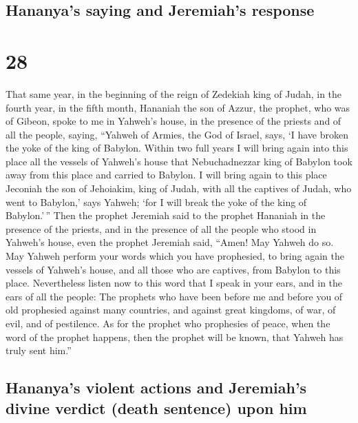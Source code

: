 \hypertarget{hananyas-saying-and-jeremiahs-response}{%
\subsection{Hananya's saying and Jeremiah's
response}\label{hananyas-saying-and-jeremiahs-response}}

\hypertarget{section-27}{%
\section{28}\label{section-27}}

 That same year, in the beginning of the reign of Zedekiah
king of Judah, in the fourth year, in the fifth month, Hananiah the son
of Azzur, the prophet, who was of Gibeon, spoke to me in Yahweh's house,
in the presence of the priests and of all the people, saying,
 ``Yahweh of Armies, the God of Israel, says, `I have
broken the yoke of the king of Babylon.  Within two full
years I will bring again into this place all the vessels of Yahweh's
house that Nebuchadnezzar king of Babylon took away from this place and
carried to Babylon.  I will bring again to this place
Jeconiah the son of Jehoiakim, king of Judah, with all the captives of
Judah, who went to Babylon,' says Yahweh; `for I will break the yoke of
the king of Babylon.'\,''  Then the prophet Jeremiah said
to the prophet Hananiah in the presence of the priests, and in the
presence of all the people who stood in Yahweh's house, 
even the prophet Jeremiah said, ``Amen! May Yahweh do so. May Yahweh
perform your words which you have prophesied, to bring again the vessels
of Yahweh's house, and all those who are captives, from Babylon to this
place.  Nevertheless listen now to this word that I speak
in your ears, and in the ears of all the people:  The
prophets who have been before me and before you of old prophesied
against many countries, and against great kingdoms, of war, of evil, and
of pestilence.  As for the prophet who prophesies of
peace, when the word of the prophet happens, then the prophet will be
known, that Yahweh has truly sent him.''

\hypertarget{hananyas-violent-actions-and-jeremiahs-divine-verdict-death-sentence-upon-him}{%
\subsection{Hananya's violent actions and Jeremiah's divine verdict
(death sentence) upon
him}\label{hananyas-violent-actions-and-jeremiahs-divine-verdict-death-sentence-upon-him}}

